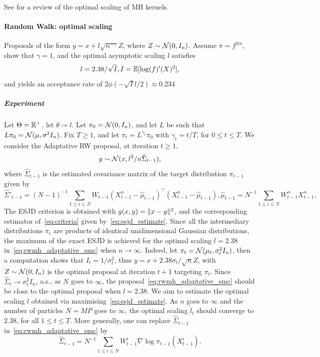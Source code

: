 See \cite{garethrosenthal01} for a review of the optimal scaling of MH kernels.

\paragraph{Random Walk: optimal scaling}
Proposals of the form $y=x + l\sqrt{n^{-\gamma}}Z$, where $Z\sim \mathcal{N}(0, I_n)$.
Assume $\pi = f^{\otimes n}$,~\citet{robertsgalman97} show that $\gamma=1$, and the optimal asymptotic scaling $l$ satisfies
\begin{equation}
    l = 2.38/\sqrt{I}, I = \mathbb{E}[ \log(f)'(X)^2],
\end{equation}
and yields an acceptance rate of $2\phi(-\sqrt{I}l/2)\approx 0.234$

\subparagraph{Experiment}
Let $\Theta = \mathbb{R}^{+}$, let $\theta\coloneq l$.
Let $\pi_0 = \mathcal{N}(0, I_n)$, and let $L$ be such that $L\pi_0 = \mathcal{N}(\mu, \sigma^2 I_n)$.
Fix $T\geq 1$, and let $\pi_t = L^{\gamma_t}\pi_0$ with $\gamma_t = t/T$, for $0\leq t\leq T$.
We consider the Adaptative RW proposal, at iteration $t\geq 1$,
\begin{equation}
    \label{eq:rwmh_adaptative_smc}
    y \sim \mathcal{N}(x, l^2/n \hat{\Sigma}_{t-1}),
\end{equation}
where $\hat{\Sigma}_{t-1}$ is the estimated covariance matrix of the target distribution $\pi_{t-1}$ given by
\begin{equation}
    \hat{\Sigma}'_{t-1}=(N-1)^{-1}\sum_{1\leq i\leq N}W_{t-1}(X_{t-1}^{n}-\hat{\mu}_{t-1})^{\top}(X_{t-1}^{n}-\hat{\mu}_{t-1}), \hat{\mu}_{t-1} = N^{-1}\sum_{1\leq i\leq N} W_{t-1}^{n}X_{t-1}^n,
\end{equation}
The ESJD criterion is obtained with $g(x, y) = \lVert x-y\rVert^2$, and the corresponding estimator of~\eqref{eq:criteria} given by~\eqref{eq:esjd_estimate}.
Since all the intermediary distributions $\pi_t$ are products of identical unidimensional Gaussian distributions, the maximum of the exact ESJD is achieved for the optimal scaling $l=2.38$ in~\eqref{eq:rwmh_adaptative_smc} when $n\to\infty$.
Indeed, let $\pi_t = \mathcal{N}(\mu_t, \sigma^2_t I_n)$, then a computation shows that $I_t= 1/\sigma^2_t$, thus $y = x+2.38\sigma_t/\sqrt{n} Z$, with $Z\sim \mathcal{N}(0, I_n)$ is the optimal proposal at iteration $t+1$ targeting $\pi_t$.
Since $\hat{\Sigma}_t\to \sigma_t^2 I_n$, a.s., as $N$ goes to $\infty$, the proposal~\eqref{eq:rwmh_adaptative_smc} should be close to the optimal proposal when $l=2.38$.
We aim to estimate the optimal scaling $l$ obtained via maximising~\eqref{eq:esjd_estimate}.
As $n$ goes to $\infty$ and the number of particles $N=MP$ goes to $\infty$, the optimal scaling $\hat{l}_{t}$ should converge to $2.38$, for all $1\leq t\leq T$.
More generally, one can replace $\hat{\Sigma}_{t-1}$ in~\eqref{eq:rwmh_adaptative_smc} by
\begin{equation}
    \hat{\Sigma}_{t-1} = N^{-1}\sum_{1\leq i\leq N} W_{t-1}^{i} \nabla \log \pi_{t-1}(X_{t-1}^{i}).
\end{equation}

